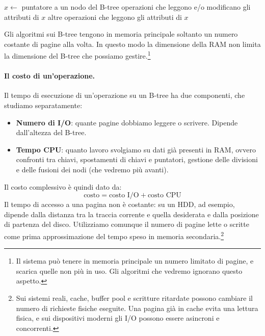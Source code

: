 \begin{algorithm}[htbp]
\caption{Schema tipico di accesso a un nodo $x$ del B-tree. La scrittura si omette se nessun attributo di $x$ è stato modificato.}\label{alg:page-access}
\begin{algorithmic}
  \State $x \gets$ puntatore a un nodo del B-tree
  \State {}
  \State operazioni che leggono e/o modificano gli attributi di $x$
  \State {} 
  \State altre operazioni che leggono gli attributi di $x$
\end{algorithmic}
\end{algorithm}

Gli algoritmi sui B-tree tengono in memoria principale soltanto un numero costante di pagine alla volta. In questo modo la dimensione della RAM non limita la dimensione del B-tree che possiamo gestire.\footnote{Il sistema può tenere in memoria principale un numero limitato di pagine, e scarica quelle non più in uso. Gli algoritmi che vedremo ignorano questo aspetto.}

\paragraph{Il costo di un'operazione.}
Il tempo di esecuzione di un'operazione su un B-tree ha due componenti, che studiamo separatamente:
\begin{itemize}
    \item \textbf{Numero di I/O}: quante pagine dobbiamo leggere o scrivere. Dipende dall'altezza del B-tree.
    \item \textbf{Tempo CPU}: quanto lavoro svolgiamo su dati già presenti in RAM, ovvero confronti tra chiavi, spostamenti di chiavi e puntatori, gestione delle divisioni e delle fusioni dei nodi (che vedremo più avanti).
\end{itemize}
Il costo complessivo è quindi dato da:
\[
\text{costo} = \text{costo I/O} + \text{costo CPU}
\]
Il tempo di accesso a una pagina non è costante: su un HDD, ad esempio, dipende dalla distanza tra la traccia corrente e quella desiderata e dalla posizione di partenza del disco. Utilizziamo comunque il numero di pagine lette o scritte come prima approssimazione del tempo speso in memoria secondaria.\footnote{Sui sistemi reali, cache, buffer pool e scritture ritardate possono cambiare il numero di richieste fisiche eseguite. Una pagina già in cache evita una lettura fisica, e sui dispositivi moderni gli I/O possono essere asincroni e concorrenti.}

